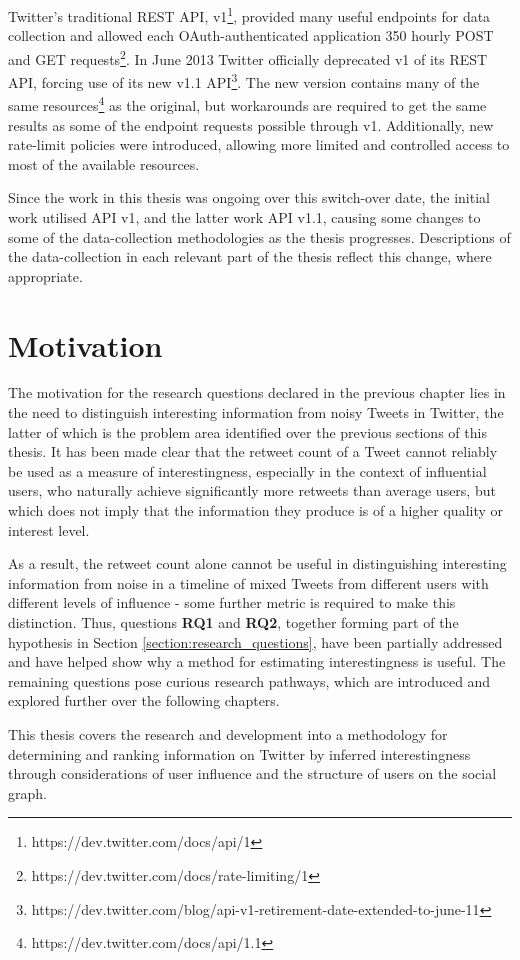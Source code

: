 Twitter's traditional REST API, v1\footnote{https://dev.twitter.com/docs/api/1}, provided many useful endpoints for data collection and allowed each OAuth-authenticated application 350 hourly POST and GET requests\footnote{https://dev.twitter.com/docs/rate-limiting/1}. In June 2013 Twitter officially deprecated v1 of its REST API, forcing use of its new v1.1 API\footnote{https://dev.twitter.com/blog/api-v1-retirement-date-extended-to-june-11}. The new version contains many of the same resources\footnote{https://dev.twitter.com/docs/api/1.1} as the original, but workarounds are required to get the same results as some of the endpoint requests possible through v1. Additionally, new rate-limit policies were introduced, allowing more limited and controlled access to most of the available resources.

Since the work in this thesis was ongoing over this switch-over date, the initial work utilised API v1, and the latter work API v1.1, causing some changes to some of the data-collection methodologies as the thesis progresses. Descriptions of the data-collection in each relevant part of the thesis reflect this change, where appropriate.


\section{Motivation}
The motivation for the research questions declared in the previous chapter lies in the need to distinguish interesting information from noisy Tweets in Twitter, the latter of which is the problem area identified over the previous sections of this thesis. It has been made clear that the retweet count of a Tweet cannot reliably be used as a measure of interestingness, especially in the context of influential users, who naturally achieve significantly more retweets than average users, but which does not imply that the information they produce is of a higher quality or interest level. 

As a result, the retweet count alone cannot be useful in distinguishing interesting information from noise in a timeline of mixed Tweets from different users with different levels of influence - some further metric is required to make this distinction. Thus, questions \textbf{RQ1} and \textbf{RQ2}, together forming part of the hypothesis in Section \ref{section:research_questions}, have been partially addressed and have helped show why a method for estimating interestingness is useful. The remaining questions pose curious research pathways, which are introduced and explored further over the following chapters.

This thesis covers the research and development into a methodology for determining and ranking information on Twitter by inferred interestingness through considerations of user influence and the structure of users on the social graph.
